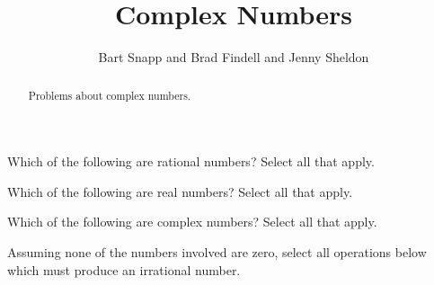 \documentclass[nooutcomes]{ximera}
\title{Complex Numbers}
\author{Bart Snapp and Brad Findell and Jenny Sheldon}
\begin{document}
\begin{abstract}
Problems about complex numbers.
\end{abstract}
\maketitle




\begin{problem}
Which of the following are rational numbers?  Select all that apply.

\begin{selectAll}
\end{selectAll}
\end{problem}



\begin{problem}
Which of the following are real numbers?  Select all that apply.

\begin{selectAll}
\end{selectAll}
\end{problem}



\begin{problem}
Which of the following are complex numbers?  Select all that apply.

\begin{selectAll}
\end{selectAll}
\end{problem}


\begin{problem}
Assuming none of the numbers involved are zero, select all operations below which must produce an irrational number.

\begin{selectAll}
\end{selectAll}
\end{problem}
\end{document}
